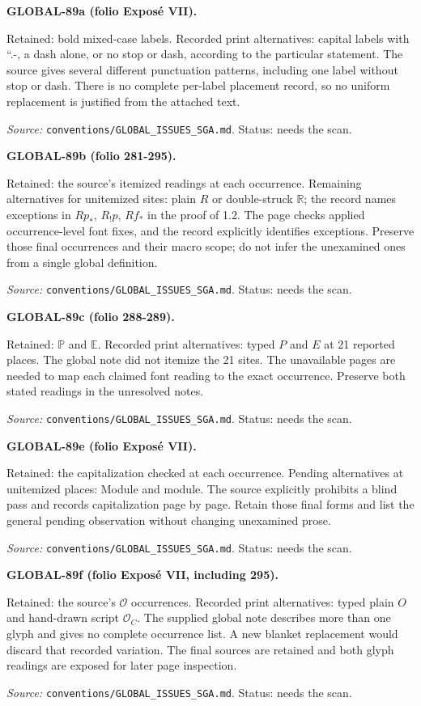 \medskip\noindent\textbf{GLOBAL-89a (folio Exposé VII).}\par
Retained: bold mixed-case labels. Recorded print alternatives: capital labels with ``.-, a dash alone, or no stop or dash, according to the particular statement.
The source gives several different punctuation patterns, including one label without stop or dash. There is no complete per-label placement record, so no uniform replacement is justified from the attached text.
\par\noindent\textit{Source: }\texttt{conventions/GLOBAL\_ISSUES\_SGA.md}. Status: needs the scan.

\medskip\noindent\textbf{GLOBAL-89b (folio 281-295).}\par
Retained: the source’s itemized readings at each occurrence. Remaining alternatives for unitemized sites: plain $R$ or double-struck $\mathbb{R}$; the record names exceptions in $Rp_*$, $R_!p$, $Rf_*$ in the proof of 1.2.
The page checks applied occurrence-level font fixes, and the record explicitly identifies exceptions. Preserve those final occurrences and their macro scope; do not infer the unexamined ones from a single global definition.
\par\noindent\textit{Source: }\texttt{conventions/GLOBAL\_ISSUES\_SGA.md}. Status: needs the scan.

\medskip\noindent\textbf{GLOBAL-89c (folio 288-289).}\par
Retained: $\mathbb{P}$ and $\mathbb{E}$. Recorded print alternatives: typed $P$ and $E$ at 21 reported places.
The global note did not itemize the 21 sites. The unavailable pages are needed to map each claimed font reading to the exact occurrence. Preserve both stated readings in the unresolved notes.
\par\noindent\textit{Source: }\texttt{conventions/GLOBAL\_ISSUES\_SGA.md}. Status: needs the scan.

\medskip\noindent\textbf{GLOBAL-89e (folio Exposé VII).}\par
Retained: the capitalization checked at each occurrence. Pending alternatives at unitemized places: Module and module.
The source explicitly prohibits a blind pass and records capitalization page by page. Retain those final forms and list the general pending observation without changing unexamined prose.
\par\noindent\textit{Source: }\texttt{conventions/GLOBAL\_ISSUES\_SGA.md}. Status: needs the scan.

\medskip\noindent\textbf{GLOBAL-89f (folio Exposé VII, including 295).}\par
Retained: the source’s $\mathcal{O}$ occurrences. Recorded print alternatives: typed plain $O$ and hand-drawn script $\mathcal{O}_C$.
The supplied global note describes more than one glyph and gives no complete occurrence list. A new blanket replacement would discard that recorded variation. The final sources are retained and both glyph readings are exposed for later page inspection.
\par\noindent\textit{Source: }\texttt{conventions/GLOBAL\_ISSUES\_SGA.md}. Status: needs the scan.

